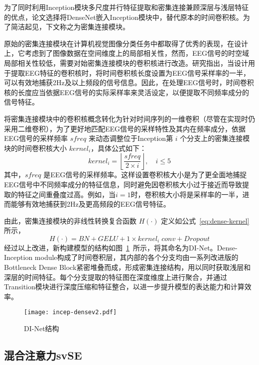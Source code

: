 为了同时利用Inception模块多尺度并行特征提取和密集连接兼顾深层与浅层特征的优点，论文选择将DenseNet嵌入Inception模块中，替代原本的时间卷积核。为了简洁起见，下文称之为密集连接模块。

原始的密集连接模块在计算机视觉图像分类任务中都取得了优秀的表现，在设计上，它考虑到了图像数据在空间维度上的局部相关性，然而，EEG信号的时空域局部相关性较低，需要对始密集连接模块的卷积核进行改造。研究指出\cite{lawhern2018eegnet}，当设计用于提取EEG特征的卷积核时，将时间卷积核长度设置为EEG信号采样率的一半，可以有效地捕获2Hz及以上频段的信号信息。因此，在处理EEG信号时，时间卷积核的长度应当依据EEG信号的实际采样率来灵活设定，以便提取不同频率成分的信号特征。

将密集连接模块中的卷积核概念转化为针对时间序列的一维卷积（尽管在实现时仍采用二维卷积），为了更好地匹配EEG信号的采样特性及其内在频率成分，依据EEG信号的采样频率 \(sfreq\) 来动态调整位于Inception第 \(i\) 个分支上的密集连接模块的时间卷积核大小 \(kernel_i\)，具体公式如下：
\begin{equation}
    kernel_i = \left \lfloor \frac{sfreq}{2 \times i} \right \rfloor , \quad i \le 5
    \label{eq:kernel_cal}
\end{equation}
其中，\(sfreq\) 是EEG信号的采样频率。这样设置卷积核大小是为了更全面地捕捉EEG信号中不同频率成分的特征信息，同时避免因卷积核大小过于接近而导致提取的特征之间重叠度过高。例如，当\(i=1\)时，卷积核大小将是采样率的一半，进而能够有效地捕获到2Hz及更高频段的EEG信号特征。

由此，密集连接模块的非线性转换复合函数 \(H(·)\) 定义如公式~\ref{eq:dense-kernel}所示，
\begin{equation}\label{eq:dense-kernel}
    H(·) = BN + GELU + 1 \times kernel_i\;conv + Dropout 
\end{equation}
经过以上改进，新构建模型的结构如图~\ref{fig:incep-dense}~所示，将其命名为DI-Net。Dense-Inception module构成了时间卷积层，其内部的各个分支均由一系列改进版的Bottleneck Dense Block紧密堆叠而成，形成密集连接结构，用以同时获取浅层和深层的时间特征。每个分支提取的特征图在深度维度上进行聚合，并通过Transition模块进行深度压缩和特征整合，以进一步提升模型的表达能力和计算效率。
\begin{figure}
  \centering
  \texttt{[image: incep-densev2.pdf]}
  \caption{DI-Net结构}
  \label{fig:incep-dense}
\end{figure}

\subsection{混合注意力svSE}

